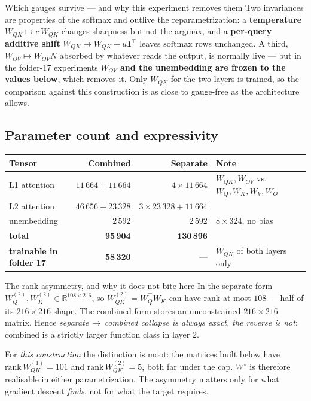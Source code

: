 \documentclass[11pt]{article}
\newcommand{\R}{\mathbb{R}}
\newcommand{\Wqk}{W_{QK}}
\newcommand{\Wov}{W_{OV}}
\newcommand{\Wq}{W_Q}
\newcommand{\Wk}{W_K}
\newcommand{\Wv}{W_V}
\newcommand{\Wo}{W_O}
\begin{document}
\begin{warningbox}{Which gauges survive --- and why this experiment removes them}
Two invariances are properties of the softmax and outlive the reparametrization: a
\textbf{temperature} $\Wqk\mapsto c\,\Wqk$ changes sharpness but not the argmax, and a
\textbf{per-query additive shift} $\Wqk\mapsto\Wqk+u\bm{1}^\top$ leaves $\mathrm{softmax}$ rows
unchanged. A third, $\Wov\mapsto\Wov N$ absorbed by whatever reads the output, is normally live
--- but in the folder-17 experiments \textbf{$\Wov$ and the unembedding are frozen to the values
below}, which removes it. Only $\Wqk$ for the two layers is trained, so the comparison against
this construction is as close to gauge-free as the architecture allows.
\end{warningbox}

\subsection{Parameter count and expressivity}

\begin{center}
\begin{tabular}{@{}lrrl@{}}
\toprule
\textbf{Tensor} & \textbf{Combined} & \textbf{Separate} & \textbf{Note}\\
\midrule
L1 attention & $11\,664+11\,664$ & $4\times11\,664$ & $\Wqk,\Wov$ vs.\ $\Wq,\Wk,\Wv,\Wo$\\
L2 attention & $46\,656+23\,328$ & $3\times23\,328+11\,664$ & \\
unembedding  & $2\,592$ & $2\,592$ & $8\times324$, no bias\\
\midrule
\textbf{total} & $\bm{95\,904}$ & $\bm{130\,896}$ & \\
\textbf{trainable in folder 17} & $\bm{58\,320}$ & --- & $\Wqk$ of both layers only\\
\bottomrule
\end{tabular}
\end{center}

\begin{notebox}{The rank asymmetry, and why it does not bite here}
In the separate form $\Wq^{(2)},\Wk^{(2)}\in\R^{108\times216}$, so
$\Wqk^{(2)}=\Wq^{\top}\Wk$ can have rank at most $108$ --- half of its $216\times216$ shape. The
combined form stores an unconstrained $216\times216$ matrix. Hence
\emph{separate$\,\to\,$combined collapse is always exact, the reverse is not}: combined is a
strictly larger function class in layer 2.

For \emph{this construction} the distinction is moot: the matrices built below have
$\mathrm{rank}\,\Wqk^{(1)}=101$ and $\mathrm{rank}\,\Wqk^{(2)}=5$, both far under the cap. $W^\star$
is therefore realisable in either parametrization. The asymmetry matters only for what gradient
descent \emph{finds}, not for what the target requires.
\end{notebox}
\end{document}
